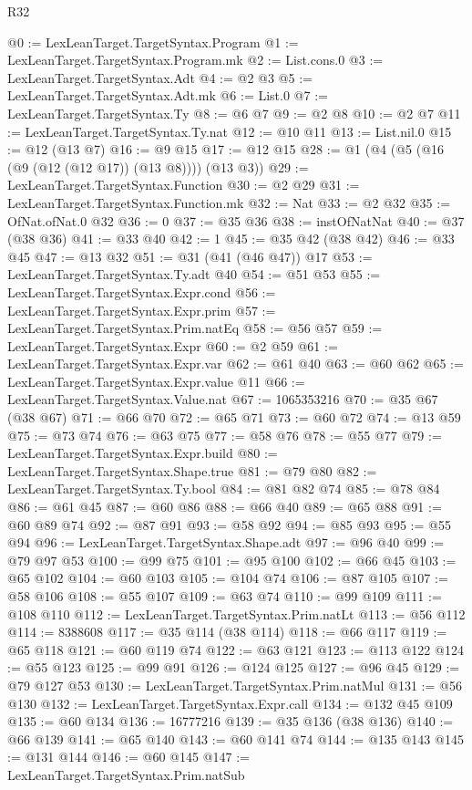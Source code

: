 \begin{lexlean}{R32}
\begin{coremodule}
@0 := LexLeanTarget.TargetSyntax.Program
@1 := LexLeanTarget.TargetSyntax.Program.mk
@2 := List.cons.{0}
@3 := LexLeanTarget.TargetSyntax.Adt
@4 := @2 @3
@5 := LexLeanTarget.TargetSyntax.Adt.mk
@6 := List.{0}
@7 := LexLeanTarget.TargetSyntax.Ty
@8 := @6 @7
@9 := @2 @8
@10 := @2 @7
@11 := LexLeanTarget.TargetSyntax.Ty.nat
@12 := @10 @11
@13 := List.nil.{0}
@15 := @12 (@13 @7)
@16 := @9 @15
@17 := @12 @15
@28 := @1 (@4 (@5 (@16 (@9 (@12 (@12 @17)) (@13 @8)))) (@13 @3))
@29 := LexLeanTarget.TargetSyntax.Function
@30 := @2 @29
@31 := LexLeanTarget.TargetSyntax.Function.mk
@32 := Nat
@33 := @2 @32
@35 := OfNat.ofNat.{0} @32
@36 := 0
@37 := @35 @36
@38 := instOfNatNat
@40 := @37 (@38 @36)
@41 := @33 @40
@42 := 1
@45 := @35 @42 (@38 @42)
@46 := @33 @45
@47 := @13 @32
@51 := @31 (@41 (@46 @47)) @17
@53 := LexLeanTarget.TargetSyntax.Ty.adt @40
@54 := @51 @53
@55 := LexLeanTarget.TargetSyntax.Expr.cond
@56 := LexLeanTarget.TargetSyntax.Expr.prim
@57 := LexLeanTarget.TargetSyntax.Prim.natEq
@58 := @56 @57
@59 := LexLeanTarget.TargetSyntax.Expr
@60 := @2 @59
@61 := LexLeanTarget.TargetSyntax.Expr.var
@62 := @61 @40
@63 := @60 @62
@65 := LexLeanTarget.TargetSyntax.Expr.value @11
@66 := LexLeanTarget.TargetSyntax.Value.nat
@67 := 1065353216
@70 := @35 @67 (@38 @67)
@71 := @66 @70
@72 := @65 @71
@73 := @60 @72
@74 := @13 @59
@75 := @73 @74
@76 := @63 @75
@77 := @58 @76
@78 := @55 @77
@79 := LexLeanTarget.TargetSyntax.Expr.build
@80 := LexLeanTarget.TargetSyntax.Shape.true
@81 := @79 @80
@82 := LexLeanTarget.TargetSyntax.Ty.bool
@84 := @81 @82 @74
@85 := @78 @84
@86 := @61 @45
@87 := @60 @86
@88 := @66 @40
@89 := @65 @88
@91 := @60 @89 @74
@92 := @87 @91
@93 := @58 @92
@94 := @85 @93
@95 := @55 @94
@96 := LexLeanTarget.TargetSyntax.Shape.adt
@97 := @96 @40
@99 := @79 @97 @53
@100 := @99 @75
@101 := @95 @100
@102 := @66 @45
@103 := @65 @102
@104 := @60 @103
@105 := @104 @74
@106 := @87 @105
@107 := @58 @106
@108 := @55 @107
@109 := @63 @74
@110 := @99 @109
@111 := @108 @110
@112 := LexLeanTarget.TargetSyntax.Prim.natLt
@113 := @56 @112
@114 := 8388608
@117 := @35 @114 (@38 @114)
@118 := @66 @117
@119 := @65 @118
@121 := @60 @119 @74
@122 := @63 @121
@123 := @113 @122
@124 := @55 @123
@125 := @99 @91
@126 := @124 @125
@127 := @96 @45
@129 := @79 @127 @53
@130 := LexLeanTarget.TargetSyntax.Prim.natMul
@131 := @56 @130
@132 := LexLeanTarget.TargetSyntax.Expr.call
@134 := @132 @45 @109
@135 := @60 @134
@136 := 16777216
@139 := @35 @136 (@38 @136)
@140 := @66 @139
@141 := @65 @140
@143 := @60 @141 @74
@144 := @135 @143
@145 := @131 @144
@146 := @60 @145
@147 := LexLeanTarget.TargetSyntax.Prim.natSub

\end{coremodule}
\end{lexlean}
